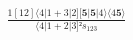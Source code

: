 \documentclass[varwidth, border=5pt]{standalone}
\begin{document}
\begin{my}
$\begin{gathered}
\scriptscriptstyle\frac{1[12]⟨4|1+3|2][𝟓|𝟓|4⟩⟨4𝟓⟩}{⟨4|1+2|3]²s_{123}}
\end{gathered}$
\end{my}
\end{document}
